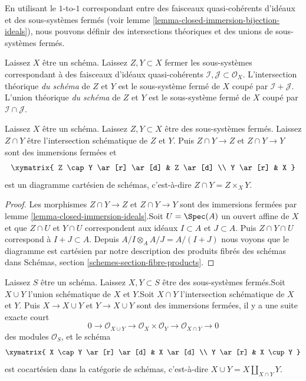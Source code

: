 \noindent
En utilisant le $1$-to-$1$ correspondant entre des faisceaux quasi-cohérents d'idéaux et des sous-systèmes fermés (voir lemme \ref{lemma-closed-immersion-bijection-ideals}), nous pouvons définir des intersections théoriques et des unions de sous-systèmes fermés.

\begin{definition}

\label{definition-scheme-theoretic-intersection-union}
Laissez $X$ être un schéma. Laissez $Z, Y \subset X$ fermer les sous-systèmes correspondant à des faisceaux d'idéaux quasi-cohérents $\mathcal{I}, \mathcal{J} \subset \mathcal{O}_X$. L'intersection théorique {\it du schéma} de $Z$ et $Y$ est le sous-système fermé de $X$ coupé par $\mathcal{I} + \mathcal{J}$. L'union théorique {\it du schéma} de $Z$ et $Y$ est le sous-système fermé de $X$ coupé par $\mathcal{I} \cap \mathcal{J}$.
\end{definition}

\begin{lemma}

\label{lemma-scheme-theoretic-intersection}
Laissez $X$ être un schéma. Laissez $Z, Y \subset X$ être des sous-systèmes fermés. Laissez $Z \cap Y$ être l'intersection schématique de $Z$ et $Y$. Puis $Z \cap Y \to Z$ et $Z \cap Y \to Y$ sont des immersions fermées et $$
\xymatrix{
Z \cap Y \ar[r] \ar[d] & Z \ar[d] \\
Y \ar[r] & X
}
$$ est un diagramme cartésien de schémas, c'est-à-dire $Z \cap Y = Z \times_X Y$.
\end{lemma}

\begin{proof}
Les morphismes $Z \cap Y \to Z$ et $Z \cap Y \to Y$ sont des immersions fermées par lemme \ref{lemma-closed-immersion-ideals}.Soit $U = \Spec(A)$ un ouvert affine de $X$ et que $Z \cap U$ et $Y \cap U$ correspondent aux idéaux $I \subset A$ et $J \subset A$. Puis $Z \cap Y \cap U$ correspond à $I + J \subset A$. Depuis $A/I \otimes_A A/J = A/(I + J)$ nous voyons que le diagramme est cartésien par notre description des produits fibrés des schémas dans Schémas, section \ref{schemes-section-fibre-products}.
\end{proof}

\begin{lemma}

\label{lemma-scheme-theoretic-union}
Laissez $S$ être un schéma. Laissez $X, Y \subset S$ être des sous-systèmes fermés.Soit $X \cup Y$ l'union schématique de $X$ et $Y$.Soit $X \cap Y$ l'intersection schématique de $X$ et $Y$. Puis $X \to X \cup Y$ et $Y \to X \cup Y$ sont des immersions fermées, il y a une suite exacte court $$
0 \to \mathcal{O}_{X \cup Y} \to \mathcal{O}_X \times \mathcal{O}_Y
\to \mathcal{O}_{X \cap Y} \to 0
$$ des modules $\mathcal{O}_S$, et le schéma $$
\xymatrix{
X \cap Y \ar[r] \ar[d] & X \ar[d] \\
Y \ar[r] & X \cup Y
}
$$ est cocartésien dans la catégorie de schémas, c'est-à-dire $X \cup Y = X \amalg_{X \cap Y} Y$.
\end{lemma}


